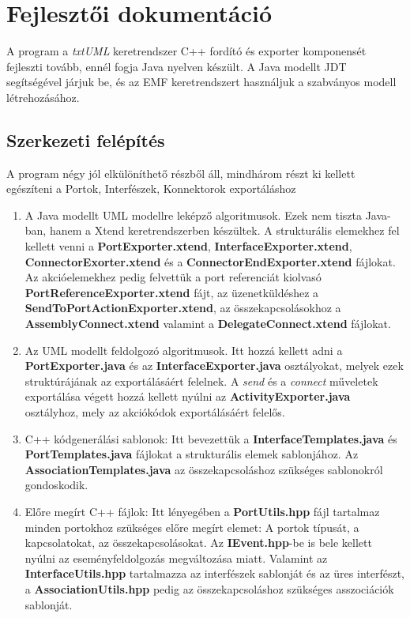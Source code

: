 \documentclass[a4paper,12pt]{report}
\begin{document}
\section{Fejlesztői dokumentáció}
A program a \textit{txtUML} keretrendszer C++ fordító és exporter komponensét fejleszti tovább, ennél fogja Java nyelven készült. A Java modellt JDT segítségével járjuk be, és az EMF keretrendszert használjuk a szabványos modell létrehozásához. \\

\subsection{Szerkezeti felépítés}
A program négy jól elkülöníthető részből áll, mindhárom részt ki kellett egészíteni a Portok, Interfészek, Konnektorok exportáláshoz

\begin{enumerate}
\item A Java modellt UML modellre leképző algoritmusok. Ezek nem tiszta Java-ban, hanem a Xtend keretrendszerben készültek. A strukturális elemekhez fel kellett venni a \textbf{PortExporter.xtend}, \textbf{InterfaceExporter.xtend}, \textbf{ConnectorExorter.xtend} és a \textbf{ConnectorEndExporter.xtend} fájlokat. Az akcióelemekhez pedig felvettük a port referenciát kiolvasó \textbf{PortReferenceExporter.xtend} fájt, az üzenetküldéshez a \textbf{SendToPortActionExporter.xtend}, az összekapcsolásokhoz a \textbf{AssemblyConnect.xtend} valamint a \textbf{DelegateConnect.xtend} fájlokat.
\item Az UML modellt feldolgozó algoritmusok. Itt hozzá kellett adni a  \textbf{PortExporter.java} és az \textbf{InterfaceExporter.java} osztályokat, melyek ezek struktúrájának az exportálásáért felelnek. A \textit{send} és a \textit{connect} műveletek exportálása végett hozzá kellett nyúlni az \textbf{ActivityExporter.java} osztályhoz, mely az akciókódok exportálásáért felelős.
\item C++ kódgenerálási sablonok: Itt bevezettük a \textbf{InterfaceTemplates.java} és \textbf{PortTemplates.java} fájlokat a strukturális elemek sablonjához. Az \textbf{AssociationTemplates.java} az összekapcsoláshoz szükséges sablonokról gondoskodik.
\item Előre megírt C++ fájlok: Itt lényegében a \textbf{PortUtils.hpp} fájl tartalmaz minden portokhoz szükséges előre megírt elemet: A portok típusát, a kapcsolatokat, az összekapcsolásokat. Az \textbf{IEvent.hpp}-be is bele kellett nyúlni az eseményfeldolgozás megváltozása miatt. Valamint az \textbf{InterfaceUtils.hpp} tartalmazza az interfészek sablonját és az üres interfészt, a \textbf{AssociationUtils.hpp} pedig az összekapcsoláshoz szükséges asszociációk sablonját.
\end{enumerate}
\end{document}
